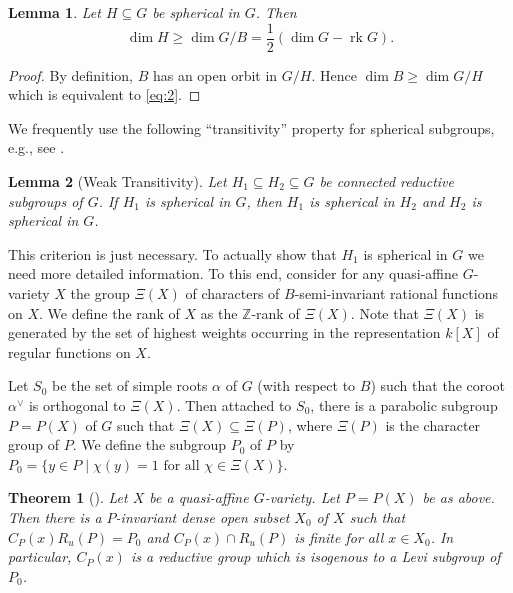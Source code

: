 \documentclass[12pt]{amsart}
\newcommand\BBZ{{\mathbb Z}}
\newcommand\rk{\operatorname{rk}}
\numberwithin{equation}{section}
\newtheorem{theorem}[theorem]{Theorem}
\newtheorem{lemma}[lemma]{Lemma}
\theoremstyle{definition}
\begin{document}
\begin{lemma}
  \label{lemma3}
  Let $H\subseteq G$ be spherical in $G$. Then
  \begin{equation}
    \label{eq:2}
    \dim H\geqslant\dim G/B=\frac{1}{2}(\dim G-\rk G).
  \end{equation}
\end{lemma}

\begin{proof}
  By definition, $B$ has an open orbit in $G/H$. Hence
  $\dim B\geqslant \dim G/H$ which is equivalent to \eqref{eq:2}.
\end{proof}

We frequently use the following ``transitivity'' property for
spherical subgroups, e.g., see \cite[Lem.~2.3]{KR}.

\begin{lemma}[Weak Transitivity]\label{lemma:weak}
  \label{lem:subgroups}
  Let $H_1\subseteq H_2\subseteq G$ be connected reductive subgroups
  of $G$.  If $H_1$ is spherical in $G$, then $H_1$ is spherical in
  $H_2$ and $H_2$ is spherical in $G$.
\end{lemma}

This criterion is just necessary. To actually show that $H_1$ is
spherical in $G$ we need more detailed information. To this end,
consider for any quasi-affine $G$-variety $X$ the group $\Xi(X)$ of
characters of $B$-semi-invariant rational functions on $X$. We define
the rank of $X$ as the $\BBZ$-rank of $\Xi(X)$. Note that $\Xi(X)$ is
generated by the set of highest weights occurring in the
representation $k[X]$ of regular functions on $X$.

Let $S_0$ be the set of simple roots $\alpha$ of $G$ (with respect to
$B$) such that the coroot $\alpha^\vee$ is orthogonal to
$\Xi(X)$. Then attached to $S_0$, there is a parabolic subgroup
$P = P(X)$ of $G$ such that $\Xi(X)\subseteq\Xi(P)$, where $\Xi(P)$ is
the character group of $P$.  We define the subgroup $P_0$ of $P$ by
$P_0 = \{y \in P \mid \chi(y)=1\text{ for all } \chi\in\Xi(X)\}$.

\begin{theorem}[{\cite[Thm.\ 4.1]{KR}}]
  \label{thm:genstab}
  Let $X$ be a quasi-affine $G$-variety. Let $P = P(X)$ be as
  above. Then there is a $P$-invariant dense open subset $X_0$ of $X$
  such that $C_P(x) R_u(P) = P_0$ and $C_P(x)\cap R_u(P)$ is finite
  for all $x\in X_0$. In particular, $C_P(x)$ is a reductive group
  which is isogenous to a Levi subgroup of $P_0$.
\end{theorem}
\end{document}
